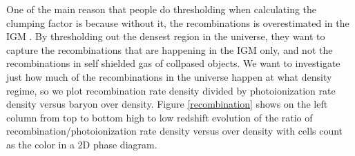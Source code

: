 \documentclass[letterpaper,10pt]{article}
\renewcommand{\(}{\left(}
\renewcommand{\)}{\right)}
\begin{document}
One of the main reason that people do thresholding when calculating the clumping factor is because without it, the recombinations is overestimated in the IGM \citep{MiraldaEscudeHaehneltRees2000, PawlikEtal2009, ShullEtAl2012, FinlatorEtAl2012}.  By thresholding out the densest region in the universe, they want to capture the recombinations that are happening in the IGM only, and not the recombinations in self shielded gas of collpased objects.  We want to investigate just how much of the recombinations in the universe happen at what density regime, so we plot recombination rate density divided by photoionization rate density versus baryon over density.  Figure \ref{recombination} shows on the left column from top to bottom high to low redshift evolution of the ratio of recombination/photoionization rate density versus over density with cells count as the color in a 2D phase diagram.  
\end{document}
